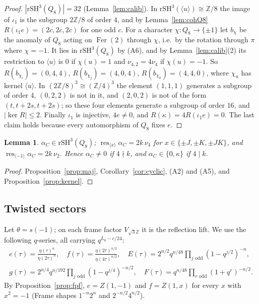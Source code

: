 \documentclass[11pt]{amsart}
\newtheorem{lemma}[theorem]{Lemma}
\theoremstyle{definition}
\newcommand{\Z}{\mathbb{Z}}
\newcommand{\Fer}{\operatorname{Fer}}
\newcommand{\res}{\operatorname{res}}
\newcommand{\rSH}{\mathrm{rSH}^3}
\begin{document}
\begin{proof}
$|\rSH(Q_8)|=32$ (Lemma~\ref{lem:calib}). In $\rSH(\langle u\rangle)\cong\Z/8$ the image of $\iota_1$ is
the subgroup $2\Z/8$ of order $4$, and by Lemma~\ref{lem:cohQ8} $R(\iota_1e)=(2c,2c,2c)$ for one odd $c$.
For a character $\chi\colon Q_8\to\{\pm1\}$ let $b_\chi$ be the anomaly of $Q_8$ acting on $\Fer(2)$
through $\chi$, i.e.\ by the rotation through $\pi$ where $\chi=-1$. It lies in $\rSH(Q_8)$ by (A6), and
by Lemma~\ref{lem:calib}(2) its restriction to $\langle u\rangle$ is $0$ if $\chi(u)=1$ and
$\nu_{4,2}=4\nu_4$ if $\chi(u)=-1$. So $R(b_{\chi_i})=(0,4,4)$, $R(b_{\chi_j})=(4,0,4)$,
$R(b_{\chi_k})=(4,4,0)$, where $\chi_u$ has kernel $\langle u\rangle$. In $(2\Z/8)^3\cong(\Z/4)^3$ the
element $(1,1,1)$ generates a subgroup of order $4$, $(0,2,2)$ is not in it, and $(2,0,2)$ is not of the
form $(t,t+2s,t+2s)$; so these four elements generate a subgroup of order $16$, and $|\ker R|\le2$. Finally
$\iota_1$ is injective, $4e\ne0$, and $R(\kappa)=4R(\iota_1e)=0$. The last claim holds because every
automorphism of $Q_8$ fixes $e$.
\end{proof}

\begin{lemma}\label{lem:layers}
$\alpha_C\in\rSH(Q_8)$; $\res_{\langle x\rangle}\alpha_C=2k\,\nu_4$ for $x\in\{\pm J,\pm K,\pm JK\}$, and
$\res_{\langle-1\rangle}\alpha_C=2k\,\nu_2$. Hence $\alpha_C\ne0$ if $4\nmid k$, and $\alpha_C\in\{0,\kappa\}$
if $4\mid k$.
\end{lemma}

\begin{proof}
Proposition~\ref{prop:maj}, Corollary~\ref{cor:cyclic}, (A2) and (A5), and
Proposition~\ref{prop:kernel}.
\end{proof}

\subsection{Twisted sectors}
Let $\theta=s(-1)$; on each frame factor $V_{\sqrt3\Z}$ it is the reflection lift. We use the
following $q$-series, all carrying $q^{L_0-c/24}$:
\begin{gather*}
  e(\tau)=\frac{\eta(\tau)^n}{\eta(2\tau)^n},\quad
  f(\tau)=\frac{\eta(2\tau)^{n/2}}{\eta(4\tau)^{n/2}},\quad
  E(\tau)=2^{n/2}q^{n/48}\prod_{j\text{ odd}}(1-q^{j/2})^{-n},\\
  g(\tau)=2^{n/4}q^{n/192}\prod_{j\text{ odd}}(1-q^{j/4})^{-n/2},\quad
  F(\tau)=q^{n/48}\prod_{r\text{ odd}}(1+q^r)^{-n/2}.
\end{gather*}
By Proposition~\ref{prop:fpf}, $e=Z(1,-1)$ and $f=Z(1,x)$ for every $x$ with $x^2=-1$ (Frame shapes
$1^{-n}2^n$ and $2^{-n/2}4^{n/2}$).
\end{document}
